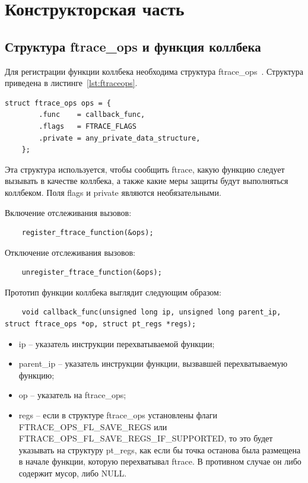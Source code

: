 \section{Конструкторская часть}

\subsection{Структура ftrace\_ops и функция коллбека}

Для регистрации функции коллбека необходима структура ftrace\_ops~\cite{ftrace_hook}. Структура приведена в листинге~\ref{lst:ftraceops}.

\begin{lstlisting}[label={lst:ftraceops}, caption={структура ftrace\_ops}]
	struct ftrace_ops ops = {
		.func    = callback_func,
		.flags   = FTRACE_FLAGS
		.private = any_private_data_structure,
	};
\end{lstlisting}

Эта структура используется, чтобы сообщить ftrace, какую функцию следует вызывать в качестве коллбека, а также какие меры защиты будут выполняться коллбеком. Поля flags и private являются необязательными.

Включение отслеживания вызовов:

\begin{lstlisting}
	register_ftrace_function(&ops);
\end{lstlisting}

Отключение отслеживания вызовов:

\begin{lstlisting}
	unregister_ftrace_function(&ops);
\end{lstlisting}

Прототип функции коллбека выглядит следующим образом:

\begin{lstlisting}
	void callback_func(unsigned long ip, unsigned long parent_ip, struct ftrace_ops *op, struct pt_regs *regs);
\end{lstlisting}

\begin{itemize}
	\item ip -- указатель инструкции перехватываемой функции;
	
	\item parent\_ip -- указатель инструкции функции, вызвавшей перехватываемую функцию;
	
	\item op -- указатель на ftrace\_ops;
	
	\item regs -- если в структуре ftrace\_ops установлены флаги\\ FTRACE\_OPS\_FL\_SAVE\_REGS или\\ FTRACE\_OPS\_FL\_SAVE\_REGS\_IF\_SUPPORTED, то это будет указывать на структуру pt\_regs, как если бы точка останова была размещена в начале функции, которую перехватывал ftrace. В противном случае он либо содержит мусор, либо NULL.
\end{itemize}

